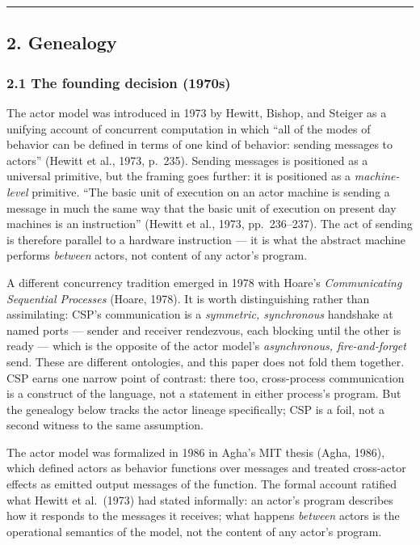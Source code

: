 \documentclass[
]{article}
\begin{document}
\begin{center}\rule{0.5\linewidth}{0.5pt}\end{center}

\subsection{2. Genealogy}\label{genealogy}

\subsubsection{2.1 The founding decision
(1970s)}\label{the-founding-decision-1970s}

The actor model was introduced in 1973 by Hewitt, Bishop, and Steiger as
a unifying account of concurrent computation in which ``all of the modes
of behavior can be defined in terms of one kind of behavior: sending
messages to actors'' (Hewitt et al., 1973, p.~235). Sending messages is
positioned as a universal primitive, but the framing goes further: it is
positioned as a \emph{machine-level} primitive. ``The basic unit of
execution on an actor machine is sending a message in much the same way
that the basic unit of execution on present day machines is an
instruction'' (Hewitt et al., 1973, pp.~236--237). The act of sending is
therefore parallel to a hardware instruction --- it is what the abstract
machine performs \emph{between} actors, not content of any actor's
program.

A different concurrency tradition emerged in 1978 with Hoare's
\emph{Communicating Sequential Processes} (Hoare, 1978). It is worth
distinguishing rather than assimilating: CSP's communication is a
\emph{symmetric, synchronous} handshake at named ports --- sender and
receiver rendezvous, each blocking until the other is ready --- which is
the opposite of the actor model's \emph{asynchronous, fire-and-forget}
send. These are different ontologies, and this paper does not fold them
together. CSP earns one narrow point of contrast: there too,
cross-process communication is a construct of the language, not a
statement in either process's program. But the genealogy below tracks
the actor lineage specifically; CSP is a foil, not a second witness to
the same assumption.

The actor model was formalized in 1986 in Agha's MIT thesis (Agha,
1986), which defined actors as behavior functions over messages and
treated cross-actor effects as emitted output messages of the function.
The formal account ratified what Hewitt et al.~(1973) had stated
informally: an actor's program describes how it responds to the messages
it receives; what happens \emph{between} actors is the operational
semantics of the model, not the content of any actor's program.
\end{document}
